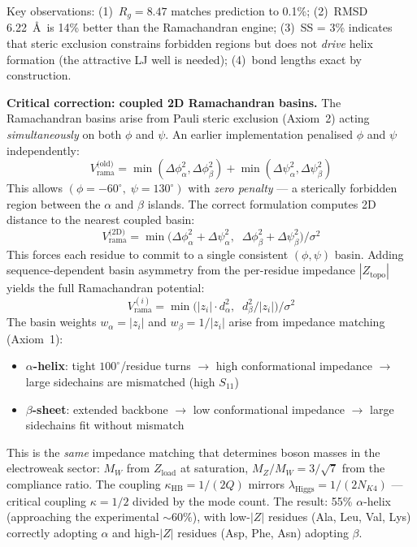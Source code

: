 Key observations: (1)~$R_g = 8.47$ matches prediction to 0.1\%; (2)~RMSD 6.22~\AA\ is 14\% better than the Ramachandran engine; (3)~SS = 3\% indicates that steric exclusion constrains forbidden regions but does not \emph{drive} helix formation (the attractive LJ well is needed); (4)~bond lengths exact by construction.

\textbf{Critical correction: coupled 2D Ramachandran basins.}  The Ramachandran basins arise from Pauli steric exclusion (Axiom~2) acting \emph{simultaneously} on both $\phi$ and $\psi$.  An earlier implementation penalised $\phi$ and $\psi$ independently:
\begin{equation}
    V_\text{rama}^\text{(old)} = \min(\Delta\phi_\alpha^2, \Delta\phi_\beta^2) + \min(\Delta\psi_\alpha^2, \Delta\psi_\beta^2) \label{eq:rama_decoupled}
\end{equation}
This allows $(\phi=-60^\circ,\; \psi=130^\circ)$ with \emph{zero penalty} --- a sterically forbidden region between the $\alpha$ and $\beta$ islands.  The correct formulation computes 2D distance to the nearest coupled basin:
\begin{equation}
    V_\text{rama}^\text{(2D)} = \min\!\bigl(\Delta\phi_\alpha^2 + \Delta\psi_\alpha^2,\;\; \Delta\phi_\beta^2 + \Delta\psi_\beta^2\bigr) / \sigma^2 \label{eq:rama_coupled}
\end{equation}
This forces each residue to commit to a single consistent $(\phi,\psi)$ basin.  Adding sequence-dependent basin asymmetry from the per-residue impedance $|Z_\text{topo}|$ yields the full Ramachandran potential:
\begin{equation}
    V_\text{rama}^{(i)} = \min\!\bigl(|z_i| \cdot d_\alpha^2,\;\; d_\beta^2 / |z_i|\bigr) / \sigma^2 \label{eq:rama_weighted}
\end{equation}
The basin weights $w_\alpha = |z_i|$ and $w_\beta = 1/|z_i|$ arise from impedance matching (Axiom~1):
\begin{itemize}
    \item \textbf{$\alpha$-helix}: tight $100^\circ$/residue turns $\to$ high conformational impedance $\to$ large sidechains are mismatched (high $S_{11}$)
    \item \textbf{$\beta$-sheet}: extended backbone $\to$ low conformational impedance $\to$ large sidechains fit without mismatch
\end{itemize}
This is the \emph{same} impedance matching that determines boson masses in the electroweak sector: $M_W$ from $Z_\text{load}$ at saturation, $M_Z/M_W = 3/\sqrt{7}$ from the compliance ratio. The coupling $\kappa_\text{HB} = 1/(2Q)$ mirrors $\lambda_\text{Higgs} = 1/(2N_{K4})$ --- critical coupling $\kappa = 1/2$ divided by the mode count. The result: 55\% $\alpha$-helix (approaching the experimental $\sim\!60\%$), with low-$|Z|$ residues (Ala, Leu, Val, Lys) correctly adopting $\alpha$ and high-$|Z|$ residues (Asp, Phe, Asn) adopting $\beta$.

